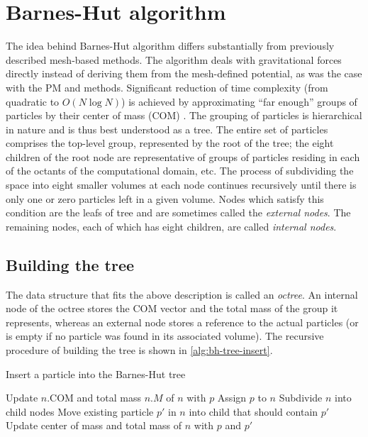 \section{Barnes-Hut algorithm}
The idea behind Barnes-Hut algorithm differs substantially from previously described mesh-based methods.
The algorithm deals with gravitational forces directly instead of deriving them from the mesh-defined potential, as was the case with the PM and \PThreeM{} methods.
Significant reduction of time complexity (from quadratic to $O(N \log N)$) is achieved by approximating ``far enough'' groups of particles by their center of mass (COM) \cite{trenti2008gravitationalnbodysimulations}.
The grouping of particles is hierarchical in nature and is thus best understood as a tree.
The entire set of particles comprises the top-level group, represented by the root of the tree;
the eight children of the root node are representative of groups of particles residing in each of the octants of the computational domain, etc.
The process of subdividing the space into eight smaller volumes at each node continues recursively until there is only one or zero particles left in a given volume.
Nodes which satisfy this condition are the leafs of tree and are sometimes called the \textit{external nodes}.
The remaining nodes, each of which has eight children, are called \textit{internal nodes}.

\subsection{Building the tree}
The data structure that fits the above description is called an \textit{octree}.
An internal node of the octree stores the COM vector and the total mass of the group it represents, whereas an external node stores a reference to the actual particles (or is empty if no particle was found in its associated volume).
The recursive procedure of building the tree is shown in \autoref{alg:bh-tree-insert}.
\begin{algorithm}
    \caption{Insert a particle into the Barnes-Hut tree}\label{alg:bh-tree-insert}
    \begin{algorithmic}
        \State Update $n.\textrm{COM}$ and total mass $n.M$ of $n$ with $p$
        \State {}
        \State Assign $p$ to $n$
        \Else {}
        \State Subdivide $n$ into child nodes
        \State Move existing particle $p'$ in $n$ into child that should contain $p'$
        \State Update center of mass and total mass of $n$ with $p$ and $p'$
        \State {}
        \EndIf
        \EndFunction
    \end{algorithmic}
\end{algorithm}

